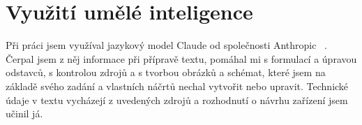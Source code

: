 \documentclass[oneside]{ctuthesis}
\makeatletter
\let\ctu@orig@cite\cite
\newcommand*{\ctu@cite@multi}[2][]{%
  \begingroup
    \ctu@citetotal\z@
    \@for\ctu@citekey:=#2\do{\advance\ctu@citetotal\@ne}%
    \ctu@citeindex\z@
    \@for\ctu@citekey:=#2\do{%
      \advance\ctu@citeindex\@ne
      \ifnum\ctu@citeindex>\@ne,\space\fi
      \ifnum\ctu@citeindex=\ctu@citetotal
        \ifx\relax#1\relax
          \ctu@orig@cite{\ctu@citekey}%
        \else
          \ctu@orig@cite[#1]{\ctu@citekey}%
        \fi
      \else
        \ctu@orig@cite{\ctu@citekey}%
      \fi}%
  \endgroup}
\renewcommand*{\cite}{%
  \ifx\protect\@typeset@protect
    \expandafter\ctu@cite@multi
  \else
    \expandafter\ctu@orig@cite
  \fi}
\theoremstyle{plain}
\theoremstyle{definition}
\theoremstyle{note}
\makeatother
\begin{document}
	\maketitle

	\linespread{1.5}\selectfont

	
	
	

	\chapter*{Využití umělé inteligence}

	Při práci jsem využíval jazykový model Claude od společnosti Anthropic~\cite{claude}. Čerpal jsem z něj informace při přípravě textu, pomáhal mi s formulací a úpravou odstavců, s kontrolou zdrojů a s tvorbou obrázků a schémat, které jsem na základě svého zadání a vlastních náčrtů nechal vytvořit nebo upravit. Technické údaje v textu vycházejí z uvedených zdrojů a rozhodnutí o návrhu zařízení jsem učinil já.
\end{document}
